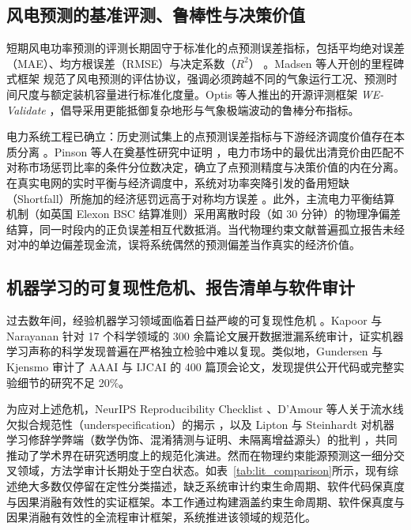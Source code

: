 \subsection{风电预测的基准评测、鲁棒性与决策价值}
短期风电功率预测的评测长期固守于标准化的点预测误差指标，包括平均绝对误差（MAE）、均方根误差（RMSE）与决定系数（$R^2$） \cite{madsen2005,optis2022}。Madsen 等人开创的里程碑式框架 \cite{madsen2005} 规范了风电预测的评估协议，强调必须跨越不同的气象运行工况、预测时间尺度与额定装机容量进行标准化度量。Optis 等人推出的开源评测框架 \textit{WE-Validate} \cite{optis2022}，倡导采用更能抵御复杂地形与气象极端波动的鲁棒分布指标。

电力系统工程已确立：历史测试集上的点预测误差指标与下游经济调度价值存在本质分离 \cite{weron2014,zhang2014wind}。Pinson 等人在奠基性研究中证明 \cite{pinson2007trading}，电力市场中的最优出清竞价由匹配不对称市场惩罚比率的条件分位数决定，确立了点预测精度与决策价值的内在分离。在真实电网的实时平衡与经济调度中，系统对功率突降引发的备用短缺（Shortfall）所施加的经济惩罚远高于对称均方误差 \cite{morales2014,yan2025economicvalue}。此外，主流电力平衡结算机制（如英国 Elexon BSC 结算准则）采用离散时段（如 30 分钟）的物理净偏差结算，同一时段内的正负误差相互代数抵消。当代物理约束文献普遍孤立报告未经对冲的单边偏差现金流，误将系统偶然的预测偏差当作真实的经济价值。

\subsection{机器学习的可复现性危机、报告清单与软件审计}
过去数年间，经验机器学习领域面临着日益严峻的可复现性危机 \cite{pineau2021,gundersen2018,kapoor2023}。Kapoor 与 Narayanan \cite{kapoor2023} 针对 17 个科学领域的 300 余篇论文展开数据泄漏系统审计，证实机器学习声称的科学发现普遍在严格独立检验中难以复现。类似地，Gundersen 与 Kjensmo \cite{gundersen2018} 审计了 AAAI 与 IJCAI 的 400 篇顶会论文，发现提供公开代码或完整实验细节的研究不足 20\%。

为应对上述危机，NeurIPS Reproducibility Checklist \cite{pineau2021}、D'Amour 等人关于流水线欠拟合规范性（underspecification）的揭示 \cite{damour2022}，以及 Lipton 与 Steinhardt 对机器学习修辞学弊端（数学伪饰、混淆猜测与证明、未隔离增益源头）的批判 \cite{lipton2019}，共同推动了学术界在研究透明度上的规范化演进。然而在物理约束能源预测这一细分交叉领域，方法学审计长期处于空白状态。如表~\ref{tab:lit_comparison}所示，现有综述绝大多数仅停留在定性分类描述，缺乏系统审计约束生命周期、软件代码保真度与因果消融有效性的实证框架。本工作通过构建涵盖约束生命周期、软件保真度与因果消融有效性的全流程审计框架，系统推进该领域的规范化。

